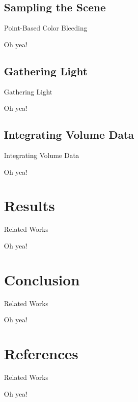 \documentclass{beamer}
\begin{document}
\subsection{Sampling the Scene}
\begin{frame}{Point-Based Color Bleeding}

    Oh yea!

\end{frame}




\subsection{Gathering Light}
\begin{frame}{Gathering Light}

    Oh yea!

\end{frame}




\subsection{Integrating Volume Data}
\begin{frame}{Integrating Volume Data}

    Oh yea!

\end{frame}




\section{Results}
\begin{frame}{Related Works}

    Oh yea!

\end{frame}




\section{Conclusion}
\begin{frame}{Related Works}

    Oh yea!

\end{frame}




\section{References}
\begin{frame}{Related Works}

    Oh yea!

\end{frame}
\end{document}

